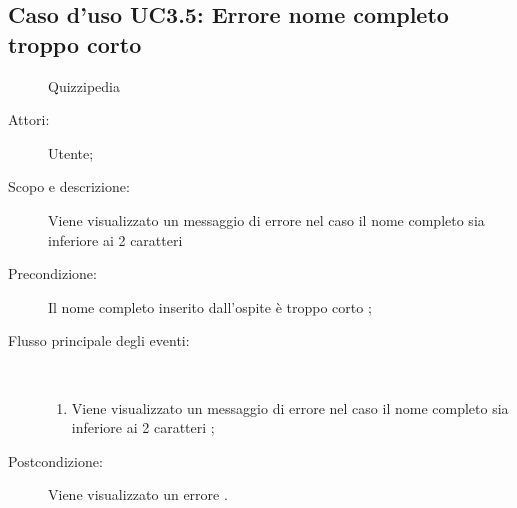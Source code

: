 \subsection{Caso d'uso UC3.5: Errore nome completo troppo corto}
	\begin{figure}[H]
		\centering
		\begin{resizedtikzpicture}{\textwidth}
		\begin{umlsystem}[x=0, fill=lightgray!20]{Quizzipedia}
		\end{umlsystem}
		\end{resizedtikzpicture}
		\caption{}
	\end{figure}
\begin{description}
\item[Attori:] Utente;
\item[Scopo e descrizione:] Viene visualizzato un messaggio di errore nel caso il nome completo sia inferiore ai 2 caratteri

      \item[Precondizione:] Il nome completo inserito dall'ospite è troppo corto
;

        \item[Flusso principale degli eventi:] \ 
 \begin{enumerate}
          \item Viene visualizzato un messaggio di errore nel caso il nome completo sia inferiore ai 2 caratteri	;

      \end{enumerate}
    \item[Postcondizione:] Viene visualizzato un errore
.
  \end{description}
\hypertarget{UC3.6}{}
